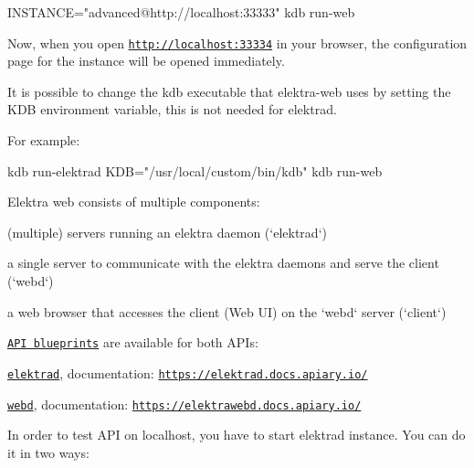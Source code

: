 \begin{DoxyCode}
INSTANCE="advanced@http://localhost:33333" kdb run-web
\end{DoxyCode}


Now, when you open \href{http://localhost:33334}{\tt http\+://localhost\+:33334} in your browser, the configuration page for the instance will be opened immediately.

It is possible to change the {\ttfamily kdb} executable that elektra-\/web uses by setting the {\ttfamily K\+DB} environment variable, this is not needed for {\ttfamily elektrad}.

For example\+:


\begin{DoxyCode}
kdb run-elektrad
KDB="/usr/local/custom/bin/kdb" kdb run-web
\end{DoxyCode}


Elektra web consists of multiple components\+:


\begin{DoxyItemize}
\item (multiple) servers running an elektra daemon (`elektrad`)
\item a single server to communicate with the elektra daemons and serve the client (`webd`)
\item a web browser that accesses the client (Web UI) on the `webd` server (`client`)
\end{DoxyItemize}





\href{https://apiblueprint.org/}{\tt A\+PI blueprints} are available for both A\+P\+Is\+:


\begin{DoxyItemize}
\item \href{https://master.libelektra.org/doc/api_blueprints/elektrad.apib}{\tt elektrad}, documentation\+: \href{https://elektrad.docs.apiary.io/}{\tt https\+://elektrad.\+docs.\+apiary.\+io/}
\item \href{https://master.libelektra.org/doc/api_blueprints/webd.apib}{\tt webd}, documentation\+: \href{https://elektrawebd.docs.apiary.io/}{\tt https\+://elektrawebd.\+docs.\+apiary.\+io/}
\end{DoxyItemize}

In order to test A\+PI on localhost, you have to start elektrad instance. You can do it in two ways\+:


